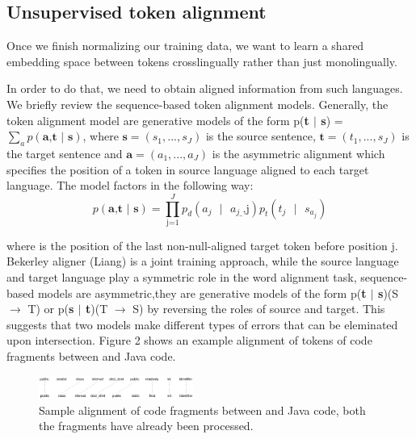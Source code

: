 \subsection{ Unsupervised token alignment}

Once we finish normalizing our training data, we want to learn a shared embedding space between tokens crosslingually rather than just monolingually.

In order to do that, we need to obtain aligned information from such languages. We briefly review the sequence-based token alignment models. Generally, the token alignment model are generative models of the form p(\textbf{t $|$ s}) = $\displaystyle\sum_{a} p(\textbf{a,t $|$ s})$, where $\textbf{s} = (s_{1},..., s_{J})$ is the source sentence, $\textbf{t} = (t_{1},..., s_{J})$ is the target sentence and $\textbf{a} = (a_{1},..., a_{J})$ is the asymmetric alignment which specifies the position of a token in source language aligned to each target language. The model factors in the following way:
\begin{displaymath}
p(\textbf{a,t $|$ s}) = \prod_\text{j=1}^J p_{d}(\text{$a_{j}$ $|$ $a_{j\_}$,j}) p_{t}(\text{$t_{j}$ $|$ $s_{a_{j}}$})
\end{displaymath}

where  is the position of the last non-null-aligned target token before position j. Bekerley aligner (Liang) is a joint training approach, while the source language and target language play a symmetric role in the word alignment task, sequence-based models are asymmetric,they are generative models of the form p(\textbf{t $|$ s})(S $\rightarrow$ T) or p(\textbf{s $|$ t})(T $\rightarrow$ S) by reversing the roles of source and target. This suggests that two models make different types of errors that can be eleminated upon intersection. Figure 2 shows an example alignment of tokens of code fragments between  and Java code.

\begin{figure}[t!]
	\includegraphics[width=0.45\textwidth]{alignment}
	\caption{Sample alignment of code fragments between  and Java code, both the fragments have already been processed.}
	\label{fig:clf}
\end{figure}

